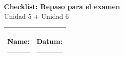 \documentclass[10pt, a4paper]{article}
\begin{document}

\begin{center}
    {\Large\bfseries\textcolor{spanisch}{Checklist: Repaso para el examen}}\\[6pt]
    {\large Unidad 5 + Unidad 6}
\end{center}

\vspace{3pt}

\begin{tabularx}{\textwidth}{|X|l|}
\hline
\textbf{Name:} \rule{5cm}{0.4pt} &
\textbf{Datum:} \rule{3cm}{0.4pt} \\
\hline
\end{tabularx}

\vspace{10pt}

\end{document}
